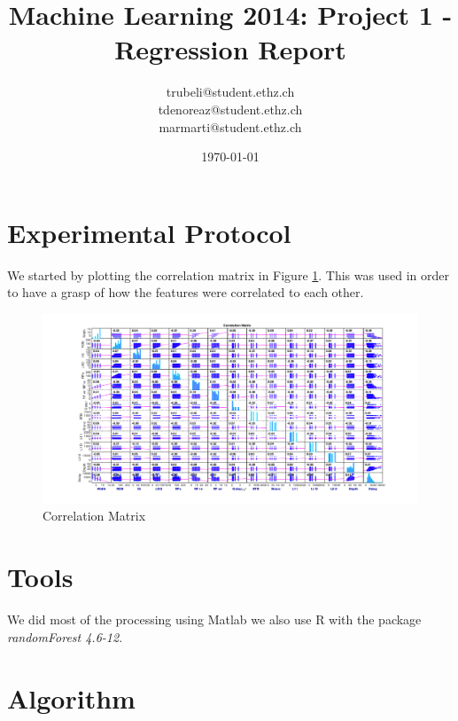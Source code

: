 \documentclass[a4paper, 11pt]{article}
\title{Machine Learning 2014: Project 1 - Regression Report}
\author{trubeli@student.ethz.ch\\ tdenoreaz@student.ethz.ch\\ marmarti@student.ethz.ch\\}
\date{\today}
\begin{document}
\maketitle

\section*{Experimental Protocol}

We started by plotting the correlation matrix in Figure \ref{fig:covmat}.
This was used in order to have a grasp of how the features were correlated to each other.

\begin{figure}[!ht]
	\centering
	\includegraphics[width=0.8\linewidth]{covmat}
	\caption{Correlation Matrix}
	\label{fig:covmat}
\end{figure}

\section{Tools}

We did most of the processing using Matlab we also use R with the package \textit{randomForest 4.6-12}.

\section{Algorithm}
\end{document}
